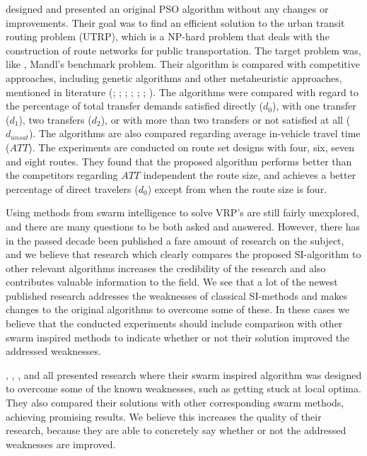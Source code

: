\citet{kechagiopoulos14} designed and presented an original PSO algorithm without any changes or improvements. Their goal was to find an efficient solution to the urban transit routing problem (UTRP), which is a NP-hard problem that deals with the construction of route networks for public transportation. The target problem was, like \citet{nikolic14}, Mandl's benchmark problem. Their algorithm is compared with competitive approaches, including genetic algorithms and other metaheuristic approaches, mentioned in literature (\citet{baaj91}; \citet{chakroborty02}; \citet{kidwai98}; \citet{fan10}; \citet{fan09-2}; \citet{zhang10}; \citet{chew12}). The algorithms were compared with regard to the percentage of total transfer demands satisfied directly ($d_0$), with one transfer ($d_1$), two transfers ($d_2$), or with more than two transfers or not satisfied at all ($d_{unsat}$). The algorithms are also compared regarding average in-vehicle travel time ($ATT$). The experiments are conducted on route set designs with four, six, seven and eight routes. They found that the proposed algorithm performs better than the competitors regarding $ATT$ independent the route size, and achieves a better percentage of direct travelers ($d_0$) except from when the route size is four.  \newline

Using methods from swarm intelligence to solve VRP's are still fairly unexplored, and there are many questions to be both asked and answered. However, there has in the passed decade been published a fare amount of research on the subject, and we believe that research which clearly compares the proposed SI-algorithm to other relevant algorithms increases the credibility of the research and also contributes valuable information to the field. We see that a lot of the newest published research addresses the weaknesses of classical SI-methods and makes changes to the original algorithms to overcome some of these. In these cases we believe that the conducted experiments should include comparison with other swarm inspired methods to indicate whether or not their solution improved the addressed weaknesses. 

\citet{tripathi09}, \citet{yang07}, \citet{salehinejad10}, and \citet{jiang10} all presented research where their swarm inspired algorithm was designed to overcome some of the known weaknesses, such as getting stuck at local optima. They also compared their solutions with other corresponding swarm methods, achieving promising results. We believe this increases the quality of their research, because they are able to concretely say whether or not the addressed weaknesses are improved. 

